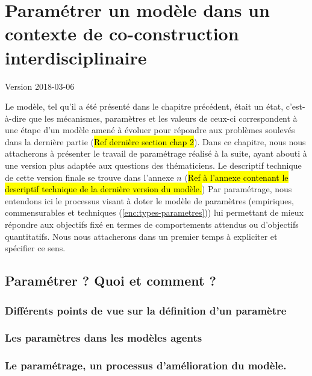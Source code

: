 \documentclass[12pt, a4paper, oneside]{book}
\begin{document}
	\setcounter{part}{0}
	\setcounter{chapter}{2}
	\setcounter{secnumdepth}{5}
		
	\chapter{Paramétrer un modèle dans un contexte de co-construction interdisciplinaire}
	\begin{center}
		{\large Version 2018-03-06}
	\end{center}

	Le modèle, tel qu'il a été présenté dans le chapitre précédent, était un \og état\fg{}, c'est-à-dire que les mécanismes, paramètres et les valeurs de ceux-ci correspondent à une étape d'un modèle amené à évoluer pour répondre aux problèmes soulevés dans la dernière partie (\hl{Ref dernière section chap 2}).
	Dans ce chapitre, nous nous attacherons à présenter le travail de paramétrage réalisé à la suite, ayant abouti à une version plus adaptée aux questions des thématiciens. Le descriptif technique de cette version \og finale\fg{} se trouve dans l'annexe $n$ (\hl{Ref à l'annexe contenant le descriptif technique de la dernière version du modèle.})
	Par paramétrage, nous entendons ici le processus visant à doter le modèle de paramètres (empiriques, \og commensurables\fg{} et techniques (\cref{enc:types-parametres})) lui permettant de mieux répondre aux objectifs fixé en termes de comportements attendus ou d'objectifs quantitatifs. Nous nous attacherons dans un premier temps à expliciter et spécifier ce sens.
	
	\setcounter{section}{1}
%	
	\section{Paramétrer ? Quoi et comment ?}
	\subsection{Différents points de vue sur la définition d'un paramètre}
	\subsection{Les paramètres dans les modèles agents}
	\subsection{Le paramétrage, un processus d'amélioration du modèle.}
\end{document}
